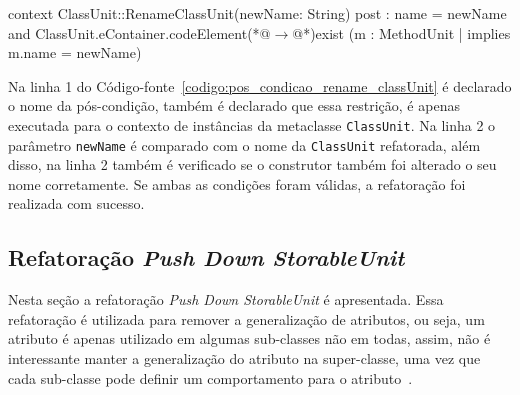 \begin{enumerate}
\begin{enumerate}
\begin{codigo}
 context ClassUnit::RenameClassUnit(newName: String)
 post : name = newName and ClassUnit.eContainer.codeElement(*@$\rightarrow$@*)exist (m : MethodUnit | implies m.name = newName)
\end{codigo}
Na linha 1 do Código-fonte~\ref{codigo:pos_condicao_rename_classUnit} é declarado o nome da pós-condição, também é declarado que essa restrição, é apenas executada para o contexto de instâncias da metaclasse \texttt{ClassUnit}. Na linha 2 o parâmetro \texttt{newName} é comparado com o nome da \texttt{ClassUnit} refatorada, além disso, na linha 2 também é verificado se o construtor também foi alterado o seu nome corretamente. Se ambas as condições foram válidas, a refatoração foi realizada com sucesso.
		\end{enumerate}
\end{enumerate}
		
\subsection{Refatoração \textit{Push Down StorableUnit}}
Nesta seção a refatoração \textit{Push Down StorableUnit} é apresentada. Essa refatoração é utilizada para remover a generalização de atributos, ou seja, um atributo é apenas utilizado em algumas sub-classes não em todas, assim, não é interessante manter a generalização do atributo na super-classe, uma vez que cada sub-classe pode definir um comportamento para o atributo~\cite{Fowler1999}.


